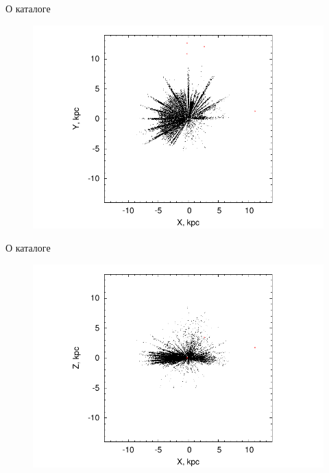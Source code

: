 \documentclass{beamer}
\begin{document}
\begin{frame}{О каталоге}
	\begin{center}
	\begin{figure}[h]
\begin{minipage}[h]{0.8\linewidth}
\includegraphics[width=1\linewidth]{pdf/xy.pdf}
\end{minipage}
\end{figure}
	\end{center}
\end{frame}

\begin{frame}{О каталоге}
	\begin{center}
	\begin{figure}[h]
\begin{minipage}[h]{0.8\linewidth}
\includegraphics[width=1\linewidth]{pdf/xz.pdf}
\end{minipage}
\end{figure}
	\end{center}
\end{frame}
\end{document}
